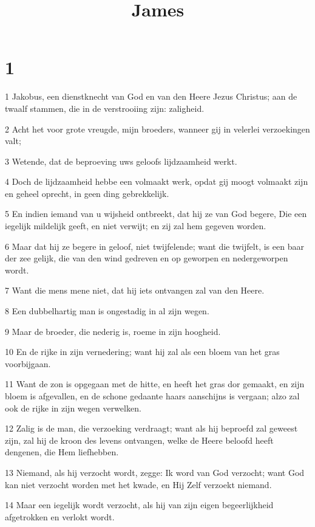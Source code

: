 

\title{James}



\chapter{1}

\par 1 Jakobus, een dienstknecht van God en van den Heere Jezus Christus; aan de twaalf stammen, die in de verstrooiing zijn: zaligheid.
\par 2 Acht het voor grote vreugde, mijn broeders, wanneer gij in velerlei verzoekingen valt;
\par 3 Wetende, dat de beproeving uws geloofs lijdzaamheid werkt.
\par 4 Doch de lijdzaamheid hebbe een volmaakt werk, opdat gij moogt volmaakt zijn en geheel oprecht, in geen ding gebrekkelijk.
\par 5 En indien iemand van u wijsheid ontbreekt, dat hij ze van God begere, Die een iegelijk mildelijk geeft, en niet verwijt; en zij zal hem gegeven worden.
\par 6 Maar dat hij ze begere in geloof, niet twijfelende; want die twijfelt, is een baar der zee gelijk, die van den wind gedreven en op geworpen en nedergeworpen wordt.
\par 7 Want die mens mene niet, dat hij iets ontvangen zal van den Heere.
\par 8 Een dubbelhartig man is ongestadig in al zijn wegen.
\par 9 Maar de broeder, die nederig is, roeme in zijn hoogheid.
\par 10 En de rijke in zijn vernedering; want hij zal als een bloem van het gras voorbijgaan.
\par 11 Want de zon is opgegaan met de hitte, en heeft het gras dor gemaakt, en zijn bloem is afgevallen, en de schone gedaante haars aanschijns is vergaan; alzo zal ook de rijke in zijn wegen verwelken.
\par 12 Zalig is de man, die verzoeking verdraagt; want als hij beproefd zal geweest zijn, zal hij de kroon des levens ontvangen, welke de Heere beloofd heeft dengenen, die Hem liefhebben.
\par 13 Niemand, als hij verzocht wordt, zegge: Ik word van God verzocht; want God kan niet verzocht worden met het kwade, en Hij Zelf verzoekt niemand.
\par 14 Maar een iegelijk wordt verzocht, als hij van zijn eigen begeerlijkheid afgetrokken en verlokt wordt.
